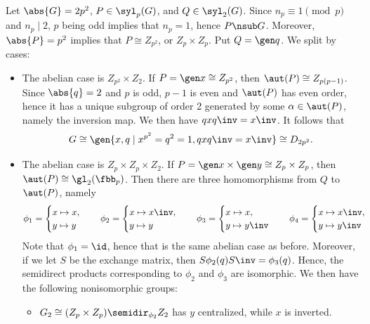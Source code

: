 \begin{sol}
    Let $\abs{G} = 2p^2$, $P \in \syl_p(G)$, and $Q \in \syl_2(G)$.
	Since $n_p \equiv 1 \pmod p$ and $n_p \mid 2$, $p$ being odd implies that $n_p = 1$, hence $P \nsub G$.
	Moreover, $\abs{P} = p^2$ implies that $P \cong Z_{p^2}$, or $Z_p \times Z_p$.
	Put $Q = \gen q$.
	We split by cases:
    \begin{itemize}
        \item The abelian case is $Z_{p^2} \times Z_2$.
	If $P = \gen x \cong Z_{p^2}$, then $\aut(P) \cong Z_{p(p - 1)}$.
	Since $\abs{q} = 2$ and $p$ is odd, $p - 1$ is even and $\aut(P)$ has even order, hence it has a unique subgroup of order 2 generated by some $\alpha \in \aut(P)$, namely the inversion map.
	We then have $qxq\inv = x\inv$.
	It follows that
        \[
        	G \cong \gen{x, q \mid x^{p^2} = q^2 = 1, qxq\inv = x\inv} \cong D_{2p^2}.
        \]
        \item The abelian case is $Z_p \times Z_p \times Z_2$.
	If $P = \gen x \times \gen y \cong Z_p \times Z_p$, then $\aut(P) \cong \gl_2(\fbb_p)$.
	Then there are three homomorphisms from $Q$ to $\aut(P)$, namely
        \[
        	\phi_1 = 
            \begin{cases}
                x \mapsto x, \\
                y \mapsto y
            \end{cases} \quad
            \phi_2 = 
            \begin{cases}
                x \mapsto x\inv, \\
                y \mapsto y
            \end{cases} \quad
            \phi_3 = 
            \begin{cases}
                x \mapsto x, \\
                y \mapsto y\inv
            \end{cases} \quad
            \phi_4 = 
            \begin{cases}
                x \mapsto x\inv, \\
                y \mapsto y\inv
            \end{cases}
        \]
        Note that $\phi_1 = \id$, hence that is the same abelian case as before.
	    Moreover, if we let $S$ be the exchange matrix, then $S\phi_2(q)S\inv = \phi_3(q)$.
	    Hence, the semidirect products corresponding to $\phi_2$ and $\phi_3$ are isomorphic.
	    We then have the following nonisomorphic groups:
        \begin{itemize}
            \item $G_2 \cong (Z_p \times Z_p) \semidir_{\phi_2} Z_2$ has $y$ centralized, while $x$ is inverted.

\end{itemize}
\end{itemize}
\end{sol}
